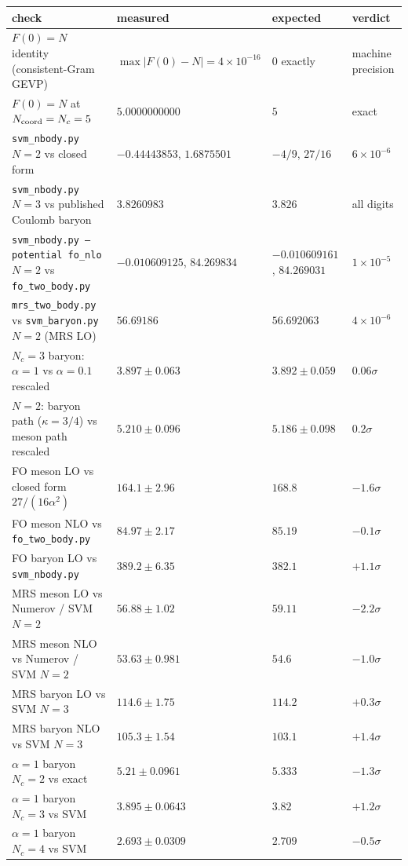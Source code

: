 \begin{tabularx}{\textwidth}{>{\raggedright\arraybackslash}Xlll}
\hline\hline
check & measured & expected & verdict \\
\hline
$F(0)=N$ identity (consistent-Gram GEVP) & $\max|F(0)-N| = 4\times10^{-16}$ & $0$ exactly & machine precision \\
$F(0)=N$ at $N_{\rm coord}=N_c=5$ & $5.0000000000$ & $5$ & exact \\
\hline
\texttt{svm\_nbody.py} $N=2$ vs closed form & $-0.44443853$, $1.6875501$ & $-4/9$, $27/16$ & $6\times10^{-6}$ \\
\texttt{svm\_nbody.py} $N=3$ vs published Coulomb baryon & $3.8260983$ & $3.826$ & all digits \\
\texttt{svm\_nbody.py --potential fo\_nlo} $N=2$ vs \texttt{fo\_two\_body.py} & $-0.010609125$, $84.269834$ & $-0.010609161$, $84.269031$ & $1\times10^{-5}$ \\
\texttt{mrs\_two\_body.py} vs \texttt{svm\_baryon.py} $N=2$ (MRS LO) & $56.69186$ & $56.692063$ & $4\times10^{-6}$ \\
\hline
$N_c=3$ baryon: $\alpha=1$ vs $\alpha=0.1$ rescaled & $3.897\pm0.063$ & $3.892\pm0.059$ & $0.06\sigma$ \\
$N=2$: baryon path ($\kappa=3/4$) vs meson path rescaled & $5.210\pm0.096$ & $5.186\pm0.098$ & $0.2\sigma$ \\
\hline
FO meson LO vs closed form $27/(16\alpha^2)$ & $164.1\pm2.96$ & $168.8$ & $-1.6\sigma$ \\
FO meson NLO vs \texttt{fo\_two\_body.py} & $84.97\pm2.17$ & $85.19$ & $-0.1\sigma$ \\
FO baryon LO vs \texttt{svm\_nbody.py} & $389.2\pm6.35$ & $382.1$ & $+1.1\sigma$ \\
MRS meson LO vs Numerov / SVM $N\!=\!2$ & $56.88\pm1.02$ & $59.11$ & $-2.2\sigma$ \\
MRS meson NLO vs Numerov / SVM $N\!=\!2$ & $53.63\pm0.981$ & $54.6$ & $-1.0\sigma$ \\
MRS baryon LO vs SVM $N\!=\!3$ & $114.6\pm1.75$ & $114.2$ & $+0.3\sigma$ \\
MRS baryon NLO vs SVM $N\!=\!3$ & $105.3\pm1.54$ & $103.1$ & $+1.4\sigma$ \\
\hline
$\alpha=1$ baryon $N_c=2$ vs exact & $5.21\pm0.0961$ & $5.333$ & $-1.3\sigma$ \\
$\alpha=1$ baryon $N_c=3$ vs SVM & $3.895\pm0.0643$ & $3.82$ & $+1.2\sigma$ \\
$\alpha=1$ baryon $N_c=4$ vs SVM & $2.693\pm0.0309$ & $2.709$ & $-0.5\sigma$ \\

\end{tabularx}
